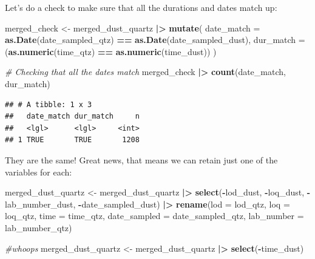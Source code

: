 \documentclass[
]{article}
\newenvironment{Shaded}{\begin{snugshade}}{\end{snugshade}}
\newcommand{\AttributeTok}[1]{\textcolor[rgb]{0.13,0.29,0.53}{#1}}
\newcommand{\CommentTok}[1]{\textcolor[rgb]{0.56,0.35,0.01}{\textit{#1}}}
\newcommand{\FunctionTok}[1]{\textcolor[rgb]{0.13,0.29,0.53}{\textbf{#1}}}
\newcommand{\NormalTok}[1]{#1}
\newcommand{\OtherTok}[1]{\textcolor[rgb]{0.56,0.35,0.01}{#1}}
\newcommand{\SpecialCharTok}[1]{\textcolor[rgb]{0.81,0.36,0.00}{\textbf{#1}}}
\begin{document}
Let's do a check to make sure that all the durations and dates match up:

\begin{Shaded}
\begin{Highlighting}[]
\NormalTok{merged\_check }\OtherTok{\textless{}{-}}\NormalTok{ merged\_dust\_quartz }\SpecialCharTok{|\textgreater{}} 
  \FunctionTok{mutate}\NormalTok{(}
    \AttributeTok{date\_match =} \FunctionTok{as.Date}\NormalTok{(date\_sampled\_qtz) }\SpecialCharTok{==} \FunctionTok{as.Date}\NormalTok{(date\_sampled\_dust),}
    \AttributeTok{dur\_match  =}\NormalTok{ (}\FunctionTok{as.numeric}\NormalTok{(time\_qtz) }\SpecialCharTok{==} \FunctionTok{as.numeric}\NormalTok{(time\_dust))}
\NormalTok{  )}

\CommentTok{\# Checking that all the dates match}
\NormalTok{merged\_check }\SpecialCharTok{|\textgreater{}} \FunctionTok{count}\NormalTok{(date\_match, dur\_match)}
\end{Highlighting}
\end{Shaded}

\begin{verbatim}
## # A tibble: 1 x 3
##   date_match dur_match     n
##   <lgl>      <lgl>     <int>
## 1 TRUE       TRUE       1208
\end{verbatim}

They are the same! Great news, that means we can retain just one of the
variables for each:

\begin{Shaded}
\begin{Highlighting}[]
\NormalTok{merged\_dust\_quartz }\OtherTok{\textless{}{-}}\NormalTok{  merged\_dust\_quartz }\SpecialCharTok{|\textgreater{}} 
  \FunctionTok{select}\NormalTok{(}\SpecialCharTok{{-}}\NormalTok{lod\_dust, }\SpecialCharTok{{-}}\NormalTok{loq\_dust, }\SpecialCharTok{{-}}\NormalTok{lab\_number\_dust, }\SpecialCharTok{{-}}\NormalTok{date\_sampled\_dust) }\SpecialCharTok{|\textgreater{}} 
  \FunctionTok{rename}\NormalTok{(}\AttributeTok{lod =}\NormalTok{ lod\_qtz,}
         \AttributeTok{loq =}\NormalTok{ loq\_qtz,}
         \AttributeTok{time =}\NormalTok{ time\_qtz,}
         \AttributeTok{date\_sampled =}\NormalTok{ date\_sampled\_qtz, }
         \AttributeTok{lab\_number =}\NormalTok{ lab\_number\_qtz)  }

\CommentTok{\#whoops }
\NormalTok{merged\_dust\_quartz }\OtherTok{\textless{}{-}}\NormalTok{  merged\_dust\_quartz }\SpecialCharTok{|\textgreater{}} 
  \FunctionTok{select}\NormalTok{(}\SpecialCharTok{{-}}\NormalTok{time\_dust) }
\end{Highlighting}
\end{Shaded}
\end{document}
